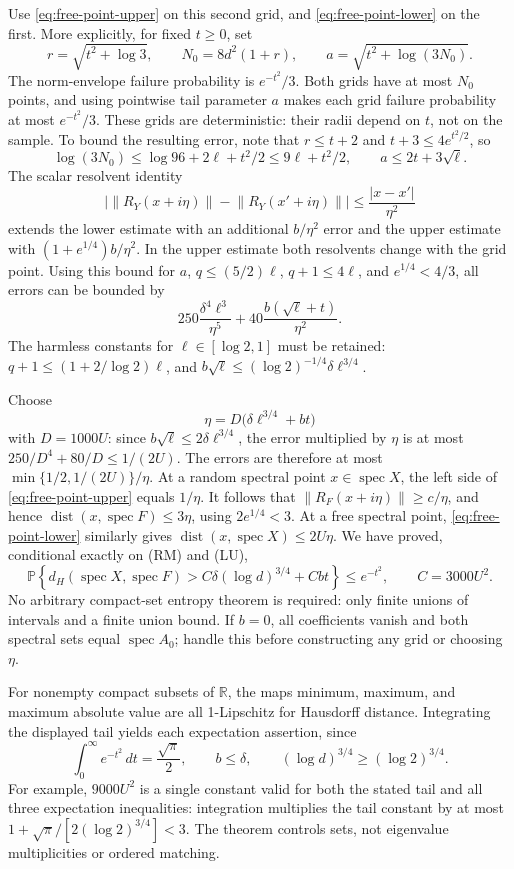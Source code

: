 \documentclass[11pt,a4paper]{article}
\newcommand{\R}{\mathbb R}
\newcommand{\norm}[1]{\left\lVert#1\right\rVert}
\begin{document}
Use \eqref{eq:free-point-upper} on this second grid, and
\eqref{eq:free-point-lower} on the first.  More explicitly, for fixed
\(t\geq0\), set
\[
 r=\sqrt{t^2+\log3},\qquad N_0=8d^2(1+r),\qquad
 a=\sqrt{t^2+\log(3N_0)}.
\]
The norm-envelope failure probability is \(e^{-t^2}/3\).
Both grids have at most \(N_0\) points, and using pointwise tail parameter
\(a\) makes each grid failure probability at most \(e^{-t^2}/3\).
These grids are deterministic: their radii depend on \(t\), not on the
sample.  To bound the resulting error, note that \(r\leq t+2\) and
\(t+3\leq4e^{t^2/2}\), so
\[
 \log(3N_0)\leq\log96+2\ell+t^2/2
                 \leq9\ell+t^2/2,
 \qquad a\leq2t+3\sqrt\ell.
\]
The scalar resolvent identity
\[
 \bigl|\norm{R_Y(x+i\eta)}-\norm{R_Y(x'+i\eta)}\bigr|
 \leq\frac{|x-x'|}{\eta^2}
\]
extends the lower estimate with an additional \(b/\eta^2\) error and the
upper estimate with \((1+e^{1/4})b/\eta^2\).  In the upper estimate both
resolvents change with the grid point.
Using this bound for \(a\), \(q\leq(5/2)\ell\),
\(q+1\leq4\ell\), and \(e^{1/4}<4/3\), all errors can be bounded by
\[
 250\frac{\delta^4\ell^3}{\eta^5}
 +40\frac{b(\sqrt\ell+t)}{\eta^2}.
\]
The harmless constants for \(\ell\in[\log2,1]\) must be retained:
\(q+1\leq(1+2/\log2)\ell\), and
\(b\sqrt\ell\leq(\log2)^{-1/4}\delta\ell^{3/4}\).

Choose
\[
 \eta=D\bigl(\delta\ell^{3/4}+bt\bigr)
\]
with \(D=1000U\): since
\(b\sqrt\ell\leq2\delta\ell^{3/4}\), the error multiplied by \(\eta\)
is at most \(250/D^4+80/D\leq1/(2U)\).
The errors are therefore at most
\(\min\{1/2,1/(2U)\}/\eta\).
At a random spectral point \(x\in\operatorname{spec}X\), the left side of
\eqref{eq:free-point-upper} equals \(1/\eta\).  It follows that
\(\norm{R_F(x+i\eta)}\geq c/\eta\), and hence
\(\operatorname{dist}(x,\operatorname{spec}F)\leq3\eta\),
using \(2e^{1/4}<3\).
At a free spectral point, \eqref{eq:free-point-lower} similarly gives
\(\operatorname{dist}(x,\operatorname{spec}X)\leq2U\eta\).
We have proved, conditional exactly on (RM) and (LU),
\[
 \mathbb P\left\{d_H(\operatorname{spec}X,\operatorname{spec}F)
 >C\delta(\log d)^{3/4}+Cbt\right\}\leq e^{-t^2},
 \qquad C=3000U^2.
\]
No arbitrary compact-set entropy theorem is required: only finite unions of
intervals and a finite union bound.  If \(b=0\), all coefficients vanish
and both spectral sets equal \(\operatorname{spec}A_0\); handle this before
constructing any grid or choosing \(\eta\).

For nonempty compact subsets of \(\R\), the maps minimum, maximum, and
maximum absolute value are all 1-Lipschitz for Hausdorff distance.  Integrating
the displayed tail yields each expectation assertion, since
\[
 \int_0^\infty e^{-t^2}\,dt=\frac{\sqrt\pi}{2},
 \qquad b\leq\delta,
 \qquad (\log d)^{3/4}\geq(\log2)^{3/4}.
\]
For example, \(9000U^2\) is a single constant valid for both the stated
tail and all three expectation inequalities: integration multiplies the
tail constant by at most
\(1+\sqrt\pi/[2(\log2)^{3/4}]<3\).
The theorem controls sets, not eigenvalue multiplicities or ordered matching.
\end{document}
